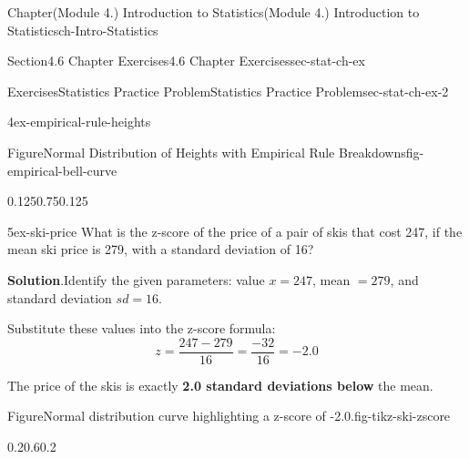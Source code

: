 \documentclass[oneside,10pt,]{book}
\newcommand{\blocktitlefont}{\relax}
\newcommand{\terminology}[1]{\textbf{#1}}
\begin{document}
\begin{chapterptx}{Chapter}{(Module 4.) Introduction to Statistics}{}{(Module 4.) Introduction to Statistics}{}{}{ch-Intro-Statistics}
\begin{sectionptx}{Section}{4.6 Chapter Exercises}{}{4.6 Chapter Exercises}{}{}{sec-stat-ch-ex}
\begin{exercises-subsection-numberless}{Exercises}{Statistics Practice Problem}{}{Statistics Practice Problem}{}{}{sec-stat-ch-ex-2}
\begin{divisionexercise}{4}{}{}{ex-empirical-rule-heights}
\begin{figureptx}{Figure}{Normal Distribution of Heights with Empirical Rule Breakdowns}{fig-empirical-bell-curve}{}
\begin{image}{0.125}{0.75}{0.125}{}
{%
}%
\end{image}%
\tcblower
\end{figureptx}%
\end{divisionexercise}%
\begin{divisionexercise}{5}{}{}{ex-ski-price}%
What is the z-score of the price of a pair of skis that cost \textdollar{}247, if the mean ski price is \textdollar{}279, with a standard deviation of \textdollar{}16?%
\par\smallskip%
\noindent\textbf{\blocktitlefont Solution}.\hypertarget{ex-ski-price-2}{}\quad{}Identify the given parameters: value \(x = 247\), mean \(= 279\), and standard deviation \(sd = 16\).%
\par
Substitute these values into the z-score formula:%
\begin{equation*}
z = \frac{247 - 279}{16} = \frac{-32}{16} = -2.0
\end{equation*}
%
\par
The price of the skis is exactly \terminology{2.0 standard deviations below} the mean.%
\begin{figureptx}{Figure}{Normal distribution curve highlighting a z-score of -2.0.}{fig-tikz-ski-zscore}{}%
\begin{image}{0.2}{0.6}{0.2}{}%
\end{image}
\end{figureptx}
\end{divisionexercise}
\end{exercises-subsection-numberless}
\end{sectionptx}
\end{chapterptx}
\end{document}
